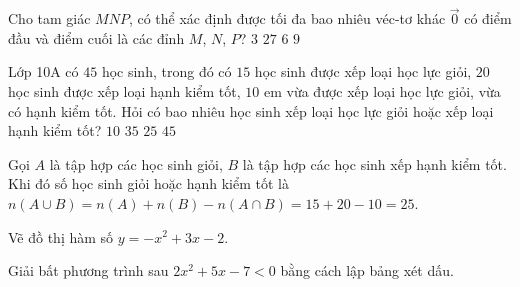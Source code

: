 \begin{ex}%
Cho tam giác $MNP$, có thể xác định được tối đa bao nhiêu véc-tơ khác $\overrightarrow{0}$ có điểm đầu và điểm cuối là các đỉnh $M$, $N$, $P$?
\choice
{$3$}
{$27$}
{\True $6$}
{$9$}
\end{ex}


\begin{ex}%
Lớp 10A có $45$ học sinh, trong đó có $15$ học sinh được xếp loại học lực giỏi, $20$ học sinh được xếp loại hạnh kiểm tốt, $10$ em vừa được xếp loại học lực giỏi, vừa có hạnh kiểm tốt. Hỏi có bao nhiêu học sinh xếp loại học lực giỏi hoặc xếp loại hạnh kiểm tốt?
\choice
{$10$}
{$35$}
{\True $25$}
{$45$}
\loigiai
{
Gọi $A$ là tập hợp các học sinh giỏi,
$B$ là tập hợp các học sinh xếp hạnh kiểm tốt.\\
Khi đó số học sinh giỏi hoặc hạnh kiểm tốt là $n(A\cup B)=n(A)+n(B)-n(A\cap B)=15+20-10=25$.

}
\end{ex}
\begin{ex}[1,0 điểm]
Vẽ đồ thị hàm số $y=-x^2+3x-2$.
\end{ex}

\begin{ex}[0,5 điểm]%
Giải bất phương trình sau $2x^2+5x-7< 0$ bằng cách lập bảng xét dấu.
\loigiai{

}
\end{ex}

